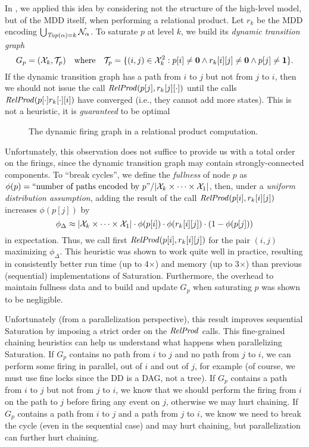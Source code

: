 \documentclass[copyright,creativecommons]{eptcs}
\newcommand{\Top}{\id{Top}} \newcommand{\Bot}{\id{Bot}}
\newcommand{\CENTERPSSCALE}[2]{\begin{center}\mbox{\epsfig{file=#1.eps, scale=#2}}\end{center}}
\begin{document}
In \cite{2006ATVA-Chaining}, we applied this idea by considering
not the structure of the high-level model, but of the MDD itself,
when performing a relational product.
Let $r_k$ be the MDD encoding
$\bigcup_{\Top(\alpha) = k} \nset_{\alpha}$.
To saturate $p$ at level $k$, we build its \emph{dynamic transition graph}
$$G_p = (\mathcal{X}_k, \mathcal{T}_p)  ~~~ \mbox{where} ~~~
\mathcal{T}_p = \{ (i,j) \in \mathcal{X}_k^2 : p[i] \neq \mathbf{0} \wedge
r_k[i][j] \neq \mathbf{0} \wedge p[j] \neq \mathbf{1} \} .$$
If the dynamic transition graph has a path from $i$ to $j$ but not
from $j$ to $i$, then we should not issue the
call $\mathit{RelProd}(p[j],r_k[j][\cdot])$ until
the calls $\mathit{RelProd}(p[\cdot]r_k[\cdot][i])$ have converged
(i.e., they cannot add more states).
This is not a heuristic, it is \emph{guaranteed} to be optimal


\begin{figure}
\begin{center}
\CENTERPSSCALE{pardis-dynamic-graph}{0.74}
\end{center}
\caption{The dynamic firing graph in a relational product computation.}
\label{FIG:pardis-dynamic-graph}
\end{figure}

Unfortunately, this observation does not suffice to provide us with a total
order on the firings, since the dynamic transition graph may contain
strongly-connected components.
To ``break cycles'', we define the \emph{fullness} of node $p$ as
$\phi(p) =  \displaystyle \mbox{``number of paths encoded by $p$''} /
|\mathcal{X}_k \times \cdots \times \mathcal{X}_1|$, then,
under a \emph{uniform distribution assumption},
adding the result of the call $\mathit{RelProd}(p[i],r_k[i][j])$
increases $\phi(p[j])$ by
$$ \phi_{\Delta} \approx |\mathcal{X}_k \times \cdots \times \mathcal{X}_1|
   \cdot \phi(p[i]) \cdot \phi(r_k[i][j]) \cdot (1 - \phi(p[j]))$$
in expectation.
Thus, we call first $\mathit{RelProd}(p[i],r_k[i][j])$ for the pair $(i,j)$
maximizing $\phi_{\Delta}$.
This heuristic was shown to work quite well in practice, resulting in
consistently better run time (up to 4$\times$) and memory (up to 3$\times$)
than previous (sequential) implementations of Saturation.
Furthermore, the overhead to maintain fullness data and
to build and update $G_p$ when saturating $p$ was shown to be negligible.

Unfortunately (from a parallelization perspective), this result
improves sequential Saturation by imposing a strict order on the
$\mathit{RelProd}$ calls.
This fine-grained chaining heuristics
can help us understand what happens when parallelizing Saturation.
If $G_p$ contains no path from $i$ to $j$ and no path from $j$ to $i$,
we can perform some firing in parallel, out of $i$ and out of $j$, for example
(of course, we must use fine locks since the DD is a DAG, not a tree).
If $G_p$ contains a path from $i$ to $j$ but not from $j$ to $i$,
we know that we should perform the firing from $i$ on the path to $j$ before
firing any event on $j$, otherwise we may hurt chaining.
If $G_p$ contains a path from $i$ to $j$ and a path from $j$ to $i$,
we know we need to break the cycle (even in the sequential case)
and may hurt chaining, but parallelization can further hurt chaining.
\end{document}

